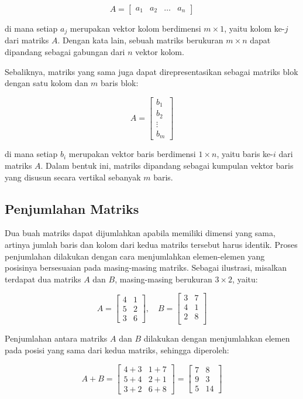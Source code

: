 \documentclass[a4paper,12pt]{report}
\numberwithin{equation}{chapter}
\begin{document}
\[
A=
\begin{bmatrix}
    a_1 & a_2 & \ldots & a_n
\end{bmatrix}
\]

di mana setiap $a_j$ merupakan vektor kolom berdimensi $m \times 1$, yaitu kolom ke-$j$ dari matriks $A$. Dengan kata lain, sebuah matriks berukuran $m \times n$ dapat dipandang sebagai gabungan dari $n$ vektor kolom.

Sebaliknya, matriks yang sama juga dapat direpresentasikan sebagai matriks blok dengan satu kolom dan $m$ baris blok:

\[
A = \begin{bmatrix}
    b_1\\
    b_2\\
    \vdots\\
    b_m
\end{bmatrix}
\]

di mana setiap $b_i$ merupakan vektor baris berdimensi $1 \times n$, yaitu baris ke-$i$ dari matriks $A$. Dalam bentuk ini, matriks dipandang sebagai kumpulan vektor baris yang disusun secara vertikal sebanyak $m$ baris.

\subsection{Penjumlahan Matriks}
Dua buah matriks dapat dijumlahkan apabila memiliki dimensi yang sama, artinya jumlah baris dan kolom dari kedua matriks tersebut harus identik. Proses penjumlahan dilakukan dengan cara menjumlahkan elemen-elemen yang posisinya bersesuaian pada masing-masing matriks. Sebagai ilustrasi, misalkan terdapat dua matriks $A$ dan $B$, masing-masing berukuran $3 \times 2$, yaitu:

\[
A = \begin{bmatrix}
4 & 1 \\
5 & 2 \\
3 & 6
\end{bmatrix}
,\quad
B = \begin{bmatrix}
3 & 7 \\
4 & 1 \\
2 & 8\\
\end{bmatrix}
\]

Penjumlahan antara matriks $A$ dan $B$ dilakukan dengan menjumlahkan elemen pada posisi yang sama dari kedua matriks, sehingga diperoleh:

\[
    A + B = \begin{bmatrix} 
                4+3 & 1+7 \\ 
                5+4 & 2+1 \\ 
                3+2 & 6+8 
            \end{bmatrix} = 
            \begin{bmatrix} 
                7 & 8 \\ 
                9 & 3 \\
                5 & 14 
            \end{bmatrix}
\]
\end{document}
